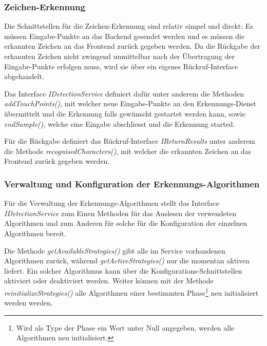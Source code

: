 \subsubsection{Zeichen-Erkennung}

Die Schnittstellen für die Zeichen-Erkennung sind relativ simpel und direkt: Es müssen Eingabe-Punkte an das Backend gesendet werden und es müssen die erkannten Zeichen an das Frontend zurück gegeben werden. Da die Rückgabe der erkannten Zeichen nicht zwingend unmittelbar nach der Übertragung der Eingabe-Punkte erfolgen muss, wird sie über ein eigenes Rückruf-Interface abgehandelt.

Das Interface \emph{IDetectionService} definiert dafür unter anderem die Methoden \emph{addTouchPoints()}, mit welcher neue Eingabe-Punkte an den Erkennungs-Dienst übermittelt und die Erkennung falls gewünscht gestartet werden kann, sowie \emph{endSample()}, welche eine Eingabe abschliesst und die Erkennung started.

Für die Rückgabe definiert das Rückruf-Interface \emph{IReturnResults} unter anderem die Methode \emph{recognisedCharacters()}, mit welcher die erkannten Zeichen an das Frontend zurück gegeben werden.

\subsubsection{Verwaltung und Konfiguration der Erkennungs-Algorithmen}

Für die Verwaltung der Erkennungs-Algorithmen stellt das Interface \emph{IDetectionService} zum Einen Methoden für das Auslesen der verwendeten Algorithmen und zum Anderen für solche für die Konfiguration der einzelnen Algorithmen bereit.

Die Methode \emph{getAvailableStrategies()} gibt alle im Service vorhandenen Algorithmen zurück, während \emph{getActiveStrategies()} nur die momentan aktiven liefert. Ein solcher Algorithmus kann über die Konfigurations-Schnittstellen aktiviert oder deaktiviert werden. Weiter können mit der Methode \emph{reinitializeStrategies()} alle Algorithmen einer bestimmten Phase\footnote{Wird als Type der Phase ein Wert unter Null angegeben, werden alle Algorithmen neu initialisiert.} neu initialisiert werden werden.

